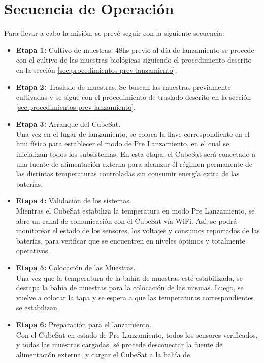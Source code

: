 \section{Secuencia de Operación}
  Para llevar a cabo la misión, se prevé seguir con la siguiente secuencia:

  \begin{itemize}
    \item \textbf{Etapa 1:} Cultivo de muestras.
        48hs previo al día de lanzamiento se procede con el cultivo de las muestras biológicas siguiendo el procedimiento descrito en la sección  \ref{sec:procedimientos-prev-lanzamiento}.
   \item \textbf{Etapa 2:} Traslado de muestras.
      Se buscan las muestras previamente cultivadas y se sigue con el procedimiento de traslado descrito en la sección \ref{sec:procedimientos-prev-lanzamiento}.
    \item \textbf{Etapa 3:} Arranque del CubeSat.\\
      Una vez en el lugar de lanzamiento, se coloca la llave correspondiente en el \acrshort{hmi} físico para establecer el modo de Pre Lanzamiento, en el cual
      se inicializan todos los subsistemas. En esta etapa, el CubeSat será conectado a una fuente de alimentación externa para alcanzar él
      régimen permanente de las distintas temperaturas controladas sin consumir energía extra de las baterías.
    \item \textbf{Etapa 4:} Validación de los sistemas.\\
      Mientras el CubeSat estabiliza la temperatura en modo Pre Lanzamiento, se abre un canal de comunicación con él
      CubeSat vía WiFi. Así, se podrá monitorear el estado de los sensores, los voltajes y consumos reportados de las
      baterías, para verificar que se encuentren en niveles óptimos y totalmente operativos.
    \item \textbf{Etapa 5:} Colocación de las Muestras.\\
      Una vez que la temperatura de la bahía de muestras esté estabilizada, se destapa la
      bahía de muestras para la colocación de las mismas. Luego, se vuelve a colocar la tapa y se espera a que las temperaturas
      correspondientes se estabilizan.
    \item \textbf{Etapa 6:} Preparación para el lanzamiento.\\
      Con el CubeSat en estado de Pre Lanzamiento, todos los sensores verificados, y todas las muestras cargadas, sé
      procede desconectar la fuente de alimentación externa, y cargar el CubeSat a la bahía de

\end{itemize}
